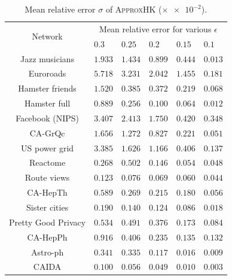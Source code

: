 \documentclass[10pt,twocolumn,twoside]{IEEEtran}
\begin{document}
\begin{table}[htbp]
    \tabcolsep=8pt
    \centering
    \fontsize{8.0}{8.8}\selectfont
    \begin{threeparttable}
        \caption{Mean relative error \(\sigma\) of \textsc{ApproxHK} (\(\times \num{e-2}\)).} %
        \label{tab:accuracy}
        \begin{tabularx}{8.5cm}{c p{0.5cm} p{0.5cm} p{0.5cm} p{0.5cm} p{0.5cm}}
            \toprule[1pt]
            \multirow{2}{*}{Network} &
            \multicolumn{5}{c}{Mean relative error for various \(\epsilon\)}                     \\
            \cmidrule{2-6}
                                     & \(0.3\)   & \(0.25\)  & \(0.2\)   & \(0.15\)  & \(0.1\)   \\
            \midrule
            Jazz musicians           & \(1.933\) & \(1.434\) & \(0.899\) & \(0.444\) & \(0.013\) \\
            Euroroads                & \(5.718\) & \(3.231\) & \(2.042\) & \(1.455\) & \(0.181\) \\
            Hamster friends          & \(1.520\) & \(0.385\) & \(0.372\) & \(0.219\) & \(0.068\) \\
            Hamster full             & \(0.889\) & \(0.256\) & \(0.100\) & \(0.064\) & \(0.012\) \\
            Facebook (NIPS)          & \(3.407\) & \(2.413\) & \(1.750\) & \(0.420\) & \(0.348\) \\
            CA-GrQc                  & \(1.656\) & \(1.272\) & \(0.827\) & \(0.221\) & \(0.051\) \\
            US power grid            & \(3.385\) & \(1.626\) & \(1.166\) & \(0.406\) & \(0.137\) \\
            Reactome                 & \(0.268\) & \(0.502\) & \(0.146\) & \(0.054\) & \(0.048\) \\
            Route views              & \(0.123\) & \(0.076\) & \(0.069\) & \(0.060\) & \(0.044\) \\
            CA-HepTh                 & \(0.589\) & \(0.269\) & \(0.215\) & \(0.180\) & \(0.056\) \\
            Sister cities            & \(0.190\) & \(0.140\) & \(0.124\) & \(0.086\) & \(0.018\) \\
            Pretty Good Privacy      & \(0.534\) & \(0.491\) & \(0.376\) & \(0.173\) & \(0.084\) \\
            CA-HepPh                 & \(0.916\) & \(0.406\) & \(0.235\) & \(0.135\) & \(0.132\) \\
            Astro-ph                 & \(0.341\) & \(0.335\) & \(0.117\) & \(0.016\) & \(0.009\) \\
            CAIDA                    & \(0.100\) & \(0.056\) & \(0.049\) & \(0.010\) & \(0.003\) \\
            \bottomrule
        \end{tabularx}
    \end{threeparttable}
\end{table}
\end{document}
